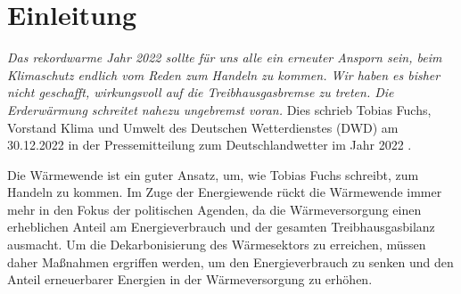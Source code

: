 	
\chapter{Einleitung}
	\textit{\frqq Das rekordwarme Jahr 2022 sollte für uns alle ein erneuter Ansporn sein, beim Klimaschutz endlich vom Reden zum Handeln zu kommen. Wir haben es bisher nicht geschafft, wirkungsvoll auf die Treibhausgasbremse zu treten. Die Erderwärmung schreitet nahezu ungebremst voran.\flqq} Dies schrieb Tobias Fuchs, Vorstand Klima und Umwelt des Deutschen Wetterdienstes (DWD) am 30.12.2022 in der Pressemitteilung zum Deutschlandwetter im Jahr 2022 \cite{DWD_Deutschlandwetter_2022}. 

	
	Die Wärmewende ist ein guter Ansatz, um, wie Tobias Fuchs schreibt, \frqq zum Handeln zu kommen\flqq. Im Zuge der Energiewende rückt die Wärmewende immer mehr in den Fokus der politischen Agenden, da die Wärmeversorgung einen erheblichen Anteil am Energieverbrauch und der gesamten Treibhausgasbilanz ausmacht. Um die Dekarbonisierung des Wärmesektors zu erreichen, müssen daher Maßnahmen ergriffen werden, um den Energieverbrauch zu senken und den Anteil erneuerbarer Energien in der Wärmeversorgung zu erhöhen. 
	
